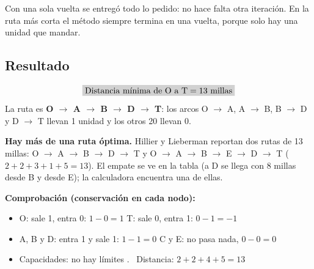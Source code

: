 \documentclass[11pt,a4paper]{article}
\newcommand{\ra}{\ensuremath{\to}}
\begin{document}
Con una sola vuelta se entregó todo lo pedido: no hace falta otra iteración. En la ruta más corta el método
siempre termina en una vuelta, porque solo hay una unidad que mandar.

\subsection*{Resultado}
\[
\res{\text{Distancia mínima de O a T} = 13 \text{ millas}}
\]
La ruta es \textbf{O \ra{} A \ra{} B \ra{} D \ra{} T}: los arcos O \ra{} A, A \ra{} B, B \ra{} D y D \ra{} T llevan 1
unidad y los otros 20 llevan 0.

\textbf{Hay más de una ruta óptima.} Hillier y Lieberman reportan dos rutas de 13 millas:
O \ra{} A \ra{} B \ra{} D \ra{} T y O \ra{} A \ra{} B \ra{} E \ra{} D \ra{} T ($2 + 2 + 3 + 1 + 5 = 13$). El empate se ve en la
tabla (a D se llega con 8 millas desde B y desde E); la calculadora encuentra una de ellas.

\textbf{Comprobación (conservación en cada nodo):}
\begin{itemize}[itemsep=2pt]
  \item O: sale 1, entra 0: $1 - 0 = 1$ \checkmark \qquad T: sale 0, entra 1: $0 - 1 = -1$ \checkmark
  \item A, B y D: entra 1 y sale 1: $1 - 1 = 0$ \checkmark \qquad C y E: no pasa nada, $0 - 0 = 0$ \checkmark
  \item Capacidades: no hay límites \checkmark. \ Distancia: $2 + 2 + 4 + 5 = 13$ \checkmark
\end{itemize}
\end{document}
